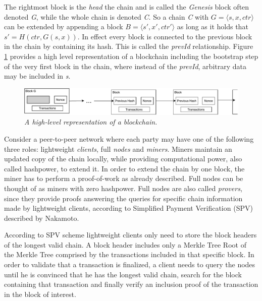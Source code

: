 \documentclass[10pt,a4paper]{article}
\theoremstyle{plain}
\theoremstyle{definition}
\theoremstyle{lemma}
\begin{document}
The rightmost block is the \textit{head} the chain and is called the \textit{Genesis} block often
denoted \textit{G}, while the whole chain is denoted \textit{C}. So a chain \textit{C} with
$G = \langle s, x, ctr \rangle$ can be extended by appending a block $B = \langle s', x', ctr'
\rangle$ as long as it holds that $s' = H(ctr, G(s,x))$. In effect every block is connected to the
previous block in the chain by containing its hash. This is called the \textit{prevId} relationship.
Figure \ref{fig:abstract_chain} provides a high level representation of a blockchain including the
bootstrap step of the very first block in the chain, where instead of the \textit{prevId},
arbitrary data may be included in \textit{s}.

\begin{figure}[h!]
	\begin{center}
		\includegraphics[scale=0.7]{figures/abstract_chain.pdf}
	\end{center}
	\caption{\textit{A high-level representation of a blockchain. }}
	\label{fig:abstract_chain}
\end{figure}


Consider a peer-to-peer network where each party may have one of the following three roles:
lightweight \textit{clients}, full \textit{nodes} and \textit{miners}.
Miners maintain an updated copy of the chain locally, while providing computational power, also
called hashpower, to extend it. In order to extend the chain by one block, the miner has to perform
a proof-of-work as already described.
Full nodes can be thought of as miners with zero hashpower. Full nodes are also called
\textit{provers}, since they provide proofs  answering the queries for specific chain information
made by lightweight clients, according to Simplified Payment Verification (SPV) described by
Nakamoto\cite{Nakamoto}.

According to SPV scheme lightweight clients only need to store the block headers of the longest
valid chain. A block header includes only a Merkle Tree Root of the Merkle Tree comprised by
the transactions included in that specific block. In order to validate that a transaction is
finalized, a client needs to query the nodes until he is convinced that he has the longest
valid chain, search for the block containing that transaction and finally verify an inclusion
proof of the transaction in the block of interest.
\end{document}
